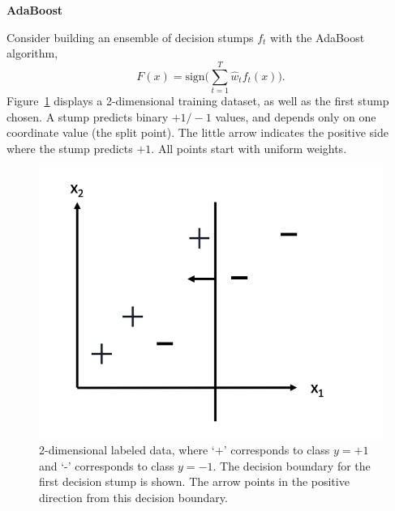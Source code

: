 \newcommand{\vect}[1]{\mathbf{#1}}

\item {} {\bf AdaBoost}

Consider building an ensemble of decision stumps $f_t$ with the AdaBoost algorithm,
$$F(x) = \text{sign}\Big(\sum_{t=1}^T \hat{w}_t f_t(x)\Big).$$
Figure~\ref{fig:adaboost} displays a 2-dimensional training dataset, as well as the first stump chosen. A stump predicts binary $+1 / -1$ values, and depends only on one coordinate value (the split point). The little arrow indicates the positive side where the stump predicts $+1$. All points start with uniform weights.
\begin{figure}[ht]
	\centering
	\includegraphics[width=0.45\linewidth]{adaboost/fig6-decision-boundary.png}
	\vspace{-0.1in}
	\caption{2-dimensional labeled data, where `+' corresponds to class $y=+1$ and `-' corresponds to class $y = -1$. The decision boundary for the first decision stump is shown.  The arrow points in the positive direction from this decision boundary.}
	\label{fig:adaboost}
\end{figure}

\begin{enumerate}
    
    
	\ifnum{} {
	
        } \fi
        
    
    
	\ifnum{} {
	
        } \fi
        
    
    
	\ifnum{} {
	
        } \fi
        
\end{enumerate}
